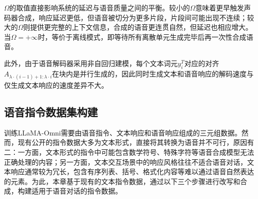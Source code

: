 
$\Omega$的取值直接影响系统的延迟与语音质量之间的平衡。较小的$\Omega$意味着更早触发声码器合成，响应延迟更低，但语音被切分为更多片段，片段间可能出现不连续；较大的$\Omega$则提供更完整的上下文信息，合成的语音更连贯自然，但延迟也相应增大。当$\Omega = +\infty$时，等价于离线模式，即等待所有离散单元生成完毕后再一次性合成语音。

此外，由于语音解码器采用非自回归建模，每个文本词元$y^T_i$对应的对齐$A_{\lambda \cdot (i-1)+1 : \lambda \cdot i}$在块内是并行生成的，因此同时生成文本和语音响应的解码速度与仅生成文本响应的速度差异不大。


\subsection{语音指令数据集构建}

训练LLaMA-Omni需要由语音指令、文本响应和语音响应组成的三元组数据。然而，现有公开的指令数据大多为文本形式，直接将其转换为语音并不可行，原因有二：一方面，文本形式的指令中可能包含数学符号、特殊字符等语音合成模型无法正确处理的内容；另一方面，文本交互场景中的响应风格往往不适合语音对话，文本响应通常较为冗长，包含有序列表、括号、格式化内容等难以通过语音自然表达的元素。为此，本章基于现有的文本指令数据，通过以下三个步骤进行改写和合成，构建适用于语音对话的指令数据。


